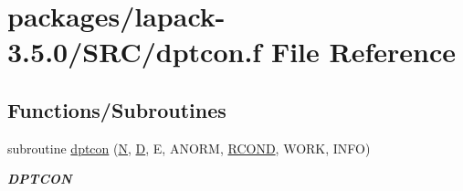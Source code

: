 \hypertarget{dptcon_8f}{}\section{packages/lapack-\/3.5.0/\+S\+R\+C/dptcon.f File Reference}
\label{dptcon_8f}
\subsection*{Functions/\+Subroutines}
\begin{DoxyCompactItemize}
\item 
subroutine \hyperlink{group__doublePTcomputational_ga97c36939111e6f008b6d9bd731854355}{dptcon} (\hyperlink{polmisc_8c_a0240ac851181b84ac374872dc5434ee4}{N}, \hyperlink{odrpack_8h_a7dae6ea403d00f3687f24a874e67d139}{D}, E, A\+N\+O\+R\+M, \hyperlink{superlu__enum__consts_8h_af00a42ecad444bbda75cde1b64bd7e72a9b5c151728d8512307565994c89919d5}{R\+C\+O\+N\+D}, W\+O\+R\+K, I\+N\+F\+O)
\begin{DoxyCompactList}\small\item\em {\bfseries D\+P\+T\+C\+O\+N} \end{DoxyCompactList}\end{DoxyCompactItemize}
